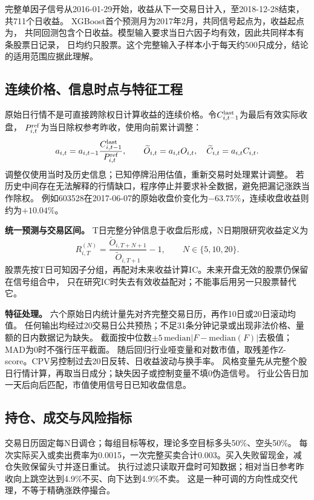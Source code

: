 \documentclass[UTF8,zihao=-4,fontset=fandol]{ctexart}
\begin{document}
完整单因子信号从2016-01-29开始，收益从下一交易日计入，至2018-12-28结束，共711个日收益。
XGBoost首个预测月为2017年2月，共同信号起点为\ComparisonStart，收益起点为\ReturnStart，
共同回测包含\ReturnDays 个日收益。模型输入要求当日六因子均有效，因此共同样本有\CommonRows 条股票日记录，
日均约\CommonMeanStocks 只股票。这个完整输入子样本小于每天约500只成分，结论的适用范围应据此理解。

\clearpage
\subsection{连续价格、信息时点与特征工程}
原始日行情不是可直接跨除权日计算收益的连续价格。令$C^{\rm last}_{i,t-1}$为最后有效实际收盘，
$P^{\rm ref}_{i,t}$为当日除权参考昨收，使用向前累计调整：
\begin{equation}
 a_{i,t}=a_{i,t-1}\frac{C^{\rm last}_{i,t-1}}{P^{\rm ref}_{i,t}},\qquad
 \widetilde O_{i,t}=a_{i,t}O_{i,t},\quad \widetilde C_{i,t}=a_{i,t}C_{i,t}.
\end{equation}
调整仅使用当时及历史信息；已知停牌沿用估值，重新交易时处理累计调整。
若历史中间存在无法解释的行情缺口，程序停止并要求补全数据，避免把漏记涨跌当作除权。
例如603528在2017-06-07的原始收盘价变化为$-63.75\%$，连续收盘收益则约为$+10.04\%$。

\textbf{统一预测与交易区间。} T日完整分钟信息于收盘后形成，N日期限研究收益定义为
\begin{equation}
R^{(N)}_{i,T}=\frac{\widetilde O_{i,T+N+1}}{\widetilde O_{i,T+1}}-1,
\qquad N\in\{5,10,20\}.
\end{equation}
股票先按T日可知因子分组，再配对未来收益计算IC。未来开盘无效的股票仍保留在信号组合中，
只在研究IC时失去有效收益配对；不能事后用另一只股票替代它。

\textbf{特征处理。} 六个原始日内统计量先对齐完整交易日历，再作10日或20日滚动均值。
任何输出均经过20交易日公共预热；不足31条分钟记录或出现非法价格、量额的日内数据记为缺失。
截面按中位数$\pm5\,\mathrm{median}|F-\mathrm{median}(F)|$去极值；MAD为0时不强行压平截面。
随后回归行业哑变量和对数市值，取残差作Z-score。CPV另控制过去20日反转、日收益波动与换手率。
风格变量先从完整个股日行情计算，再取当日成分；缺失因子或控制变量不填0伪造信号。
行业公告日加一天后向后匹配，市值使用信号日已知收盘信息。

\subsection{持仓、成交与风险指标}
交易日历固定每N日调仓；每组目标等权，理论多空目标多头50\%、空头50\%。
每次实际买入或卖出费率为0.0015，一次完整买卖合计0.003。买入失败留现金，减仓失败保留头寸并逐日重试。
执行过滤只读取开盘时可知数据；相对当日参考昨收向上跳空达到4.9\%不买、向下达到4.9\%不卖。
这是一种可调的方向性成交代理，不等于精确涨跌停撮合。
\end{document}
